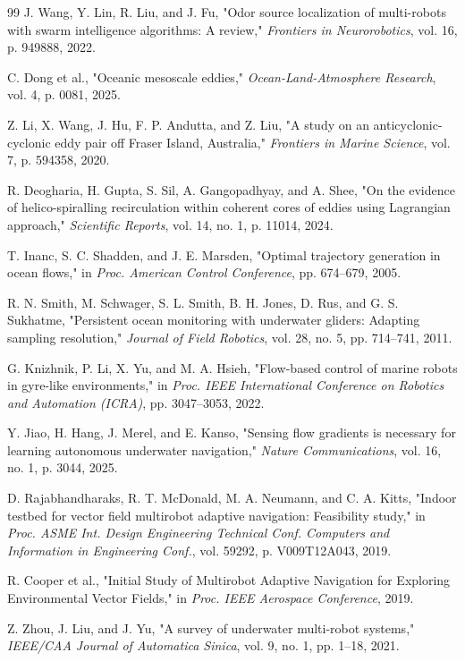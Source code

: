 \documentclass[lettersize,journal]{IEEEtran}
\begin{document}
\begin{thebibliography}{99}
 J. Wang, Y. Lin, R. Liu, and J. Fu, "Odor source localization of multi-robots with swarm intelligence algorithms: A review," \textit{Frontiers in Neurorobotics}, vol. 16, p. 949888, 2022.

 C. Dong et al., "Oceanic mesoscale eddies," \textit{Ocean-Land-Atmosphere Research}, vol. 4, p. 0081, 2025.

 Z. Li, X. Wang, J. Hu, F. P. Andutta, and Z. Liu, "A study on an anticyclonic-cyclonic eddy pair off Fraser Island, Australia," \textit{Frontiers in Marine Science}, vol. 7, p. 594358, 2020.

 R. Deogharia, H. Gupta, S. Sil, A. Gangopadhyay, and A. Shee, "On the evidence of helico-spiralling recirculation within coherent cores of eddies using Lagrangian approach," \textit{Scientific Reports}, vol. 14, no. 1, p. 11014, 2024.

 T. Inanc, S. C. Shadden, and J. E. Marsden, "Optimal trajectory generation in ocean flows," in \textit{Proc. American Control Conference}, pp. 674--679, 2005.

 R. N. Smith, M. Schwager, S. L. Smith, B. H. Jones, D. Rus, and G. S. Sukhatme, "Persistent ocean monitoring with underwater gliders: Adapting sampling resolution," \textit{Journal of Field Robotics}, vol. 28, no. 5, pp. 714--741, 2011.

 G. Knizhnik, P. Li, X. Yu, and M. A. Hsieh, "Flow-based control of marine robots in gyre-like environments," in \textit{Proc. IEEE International Conference on Robotics and Automation (ICRA)}, pp. 3047--3053, 2022.

 Y. Jiao, H. Hang, J. Merel, and E. Kanso, "Sensing flow gradients is necessary for learning autonomous underwater navigation," \textit{Nature Communications}, vol. 16, no. 1, p. 3044, 2025.

 D. Rajabhandharaks, R. T. McDonald, M. A. Neumann, and C. A. Kitts, "Indoor testbed for vector field multirobot adaptive navigation: Feasibility study," in \textit{Proc. ASME Int. Design Engineering Technical Conf. Computers and Information in Engineering Conf.}, vol. 59292, p. V009T12A043, 2019.

 R. Cooper et al., "Initial Study of Multirobot Adaptive Navigation for Exploring Environmental Vector Fields," in \textit{Proc. IEEE Aerospace Conference}, 2019.

 Z. Zhou, J. Liu, and J. Yu, "A survey of underwater multi-robot systems," \textit{IEEE/CAA Journal of Automatica Sinica}, vol. 9, no. 1, pp. 1--18, 2021.


\end{thebibliography}
\end{document}
